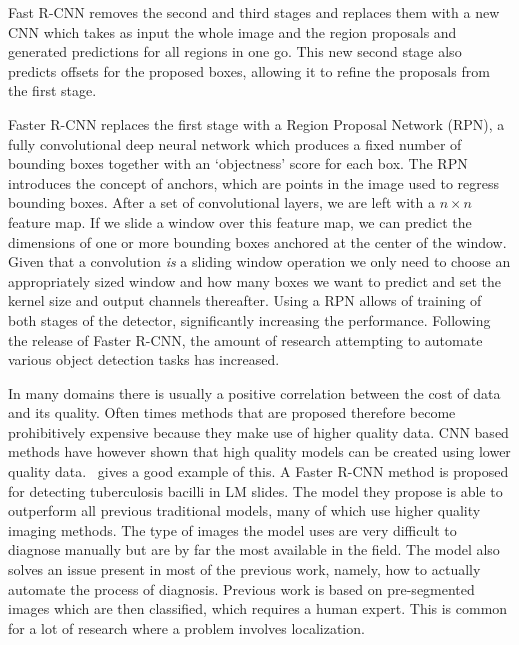 Fast R-CNN removes the second and third stages and replaces them with a new CNN which takes as input the whole image and the region proposals and generated predictions for all regions in one go.
This new second stage also predicts offsets for the proposed boxes, allowing it to refine the proposals from the first stage.

Faster R-CNN replaces the first stage with a Region Proposal Network (RPN), a fully convolutional deep neural network which produces a fixed number of bounding boxes together with an `objectness' score for each box.
The RPN introduces the concept of anchors, which are points in the image used to regress bounding boxes.
After a set of convolutional layers, we are left with a \(n\times n\) feature map.
If we slide a window over this feature map, we can predict the dimensions of one or more bounding boxes anchored at the center of the window.
Given that a convolution \textit{is} a sliding window operation we only need to choose an appropriately sized window and how many boxes we want to predict and set the kernel size and output channels thereafter.
Using a RPN allows of training of both stages of the detector, significantly increasing the performance.
Following the release of Faster R-CNN, the amount of research attempting to automate various object detection tasks has increased. 

In many domains there is usually a positive correlation between the cost of data and its quality.
Often times methods that are proposed therefore become prohibitively expensive because they make use of higher quality data.
CNN based methods have however shown that high quality models can be created using lower quality data.~\cite{el_melegy_automatic_2019} gives a good example of this.
A Faster R-CNN method is proposed for detecting tuberculosis bacilli in LM slides.
The model they propose is able to outperform all previous traditional models, many of which use higher quality imaging methods.
The type of images the model uses are very difficult to diagnose manually but are by far the most available in the field.
The model also solves an issue present in most of the previous work, namely, how to actually automate the process of diagnosis.
Previous work is based on pre-segmented images which are then classified, which requires a human expert.
This is common for a lot of research where a problem involves localization. 

